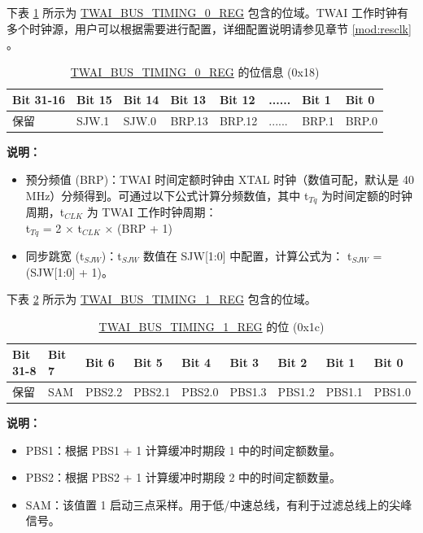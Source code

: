 \documentclass[main\_\_CN.tex]{subfiles}
\begin{document}
下表 \ref{tab:twai-bit-info-bus-timing-0-reg} 所示为 \hyperref[regdesc:TWAIBUSTIMING0REG]{TWAI\_BUS\_TIMING\_0\_REG} 包含的位域。TWAI 工作时钟有多个时钟源，用户可以根据需要进行配置，详细配置说明请参见章节 \ref{mod:resclk} \textit{}。

\begin{longtable}[c]{|p{2cm}|p{1.5cm}|p{1.5cm}|p{1.5cm}|p{1.5cm}|p{1.5cm}|p{1.5cm}|p{1.5cm}|}
\caption{\hyperref[regdesc:TWAIBUSTIMING0REG]{TWAI\_BUS\_TIMING\_0\_REG} 的位信息 (0x18)}
\label{tab:twai-bit-info-bus-timing-0-reg}\\\hline
\rowcolor{lightgray}
   \textbf{Bit 31-16} & \textbf{Bit 15} & \textbf{Bit 14} & \textbf{Bit 13} & \textbf{Bit 12} & \textbf{......} & \textbf{Bit 1} & \textbf{Bit 0}\\\hline
  保留& SJW.1 & SJW.0 & BRP.13 & BRP.12 & ...... & BRP.1 & BRP.0\\\hline
\end{longtable}
\vspace{-1.5em}
{\bfseries 说明：}\\
\begin{itemize}
    \item 预分频值 (BRP)：TWAI 时间定额时钟由 XTAL 时钟（数值可配，默认是 40 MHz）分频得到。可通过以下公式计算分频数值，其中 t$_{Tq}$ 为时间定额的时钟周期，t$_{CLK}$ 为 TWAI 工作时钟周期：\\

t$_{Tq}$ = 2 × t$_{CLK}$ × (BRP + 1)

    \item 同步跳宽 (t$_{SJW}$)：t$_{SJW}$ 数值在 SJW[1:0] 中配置，计算公式为：
    t$_{SJW}$ = (SJW[1:0] + 1)。
\end{itemize}

下表 \ref{tab:twai-bit-info-bus-timing-1-reg} 所示为 \hyperref[regdesc:TWAIBUSTIMING1REG]{TWAI\_BUS\_TIMING\_1\_REG} 包含的位域。

\begin{longtable}[c]{|p{1.4cm}|p{1.4cm}|p{1.4cm}|p{1.4cm}|p{1.4cm}|p{1.4cm}|p{1.4cm}|p{1.4cm}|p{1.4cm}|}
    \caption{\hyperref[regdesc:TWAIBUSTIMING1REG]{TWAI\_BUS\_TIMING\_1\_REG} 的位 (0x1c)}
    \label{tab:twai-bit-info-bus-timing-1-reg}\\
    \hline
       \rowcolor{lightgray}
   \textbf{Bit 31-8} & \textbf{Bit 7} & \textbf{Bit 6} & \textbf{Bit 5} & \textbf{Bit 4} & \textbf{Bit 3} & \textbf{Bit 2} & \textbf{Bit 1} & \textbf{Bit 0}\\\hline
   保留 & SAM & PBS2.2 & PBS2.1 & PBS2.0 & PBS1.3 &PBS1.2 & PBS1.1 & PBS1.0\\
    \hline
\end{longtable}
\vspace{-1.5em}
{\bfseries 说明：}\\
\begin{itemize}
    \item PBS1：根据 PBS1 + 1 计算缓冲时期段 1 中的时间定额数量。
    \item PBS2：根据 PBS2 + 1 计算缓冲时期段 2 中的时间定额数量。
    \item SAM：该值置 1 启动三点采样。用于低/中速总线，有利于过滤总线上的尖峰信号。
\end{itemize}
\end{document}
